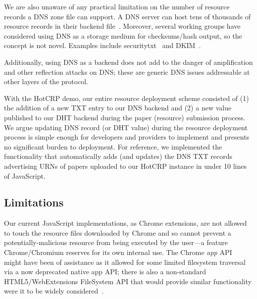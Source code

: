 We are also unaware of any practical limitation on the number of resource
records a DNS zone file can support. A DNS server can host tens of thousands of
resource records in their backend file~\cite{DNS1, DNS2}. Moreover, several
working groups have considered using DNS as a storage medium for checksums/hash
output, so the concept is not novel. Examples include
securitytxt~\cite{draft-sectxt} and DKIM~\cite{DKIM}.

Additionally, using DNS as a backend does not add to the danger of amplification
and other reflection attacks on DNS; these are generic DNS issues addressable at
other layers of the protocol.

With the HotCRP demo, our entire resource deployment scheme consisted of (1) the
addition of a new TXT entry to our DNS backend and (2) a new value published to
our DHT backend during the paper (resource) submission process. We argue
updating DNS record (or DHT value) during the resource deployment process is
simple enough for developers and providers to implement and presents no
significant burden to deployment. For reference, we implemented the
functionality that automatically adds (and updates) the DNS TXT records
advertising URNs of papers uploaded to our HotCRP instance in under 10 lines of
JavaScript.

\subsection{Limitations}


Our current JavaScript implementations, as Chrome extensions, are not allowed to
touch the resource files downloaded by Chrome and so cannot prevent a
potentially-malicious resource from being executed by the user---a feature
Chrome/Chromium reserves for its own internal use. The Chrome \textit{app}
API~\cite{AppAPI} might have been of assistance as it allowed for some limited
filesystem traversal via a now deprecated native app API; there is also a
non-standard HTML5/WebExtensions FileSystem API that would provide similar
functionality were it to be widely considered~\cite{deadSpec}.

